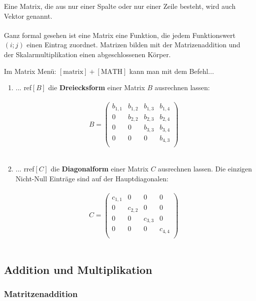 \documentclass[../MAIN/main.tex]{subfiles}
\begin{document}
\begin{Bemerkung}
Eine Matrix, die aus nur einer Spalte oder nur einer Zeile besteht, wird auch Vektor genannt.\\\\
Ganz formal gesehen ist eine Matrix eine Funktion, die jedem Funktionswert $(i;j)$ einen Eintrag zuordnet. Matrizen bilden mit der Matrizenaddition und der Skalarmultiplikation einen abgeschlossenen Körper.
\end{Bemerkung}


\begin{GTR-Tipp}
Im Matrix Menü: $[\text{matrix}] + [\text{MATH}]$ kann man mit dem Befehl...\\
\begin{enumerate}
\item ... ref$[B]$ die \textbf{Dreiecksform} einer Matrix $B$ ausrechnen lassen:\\\\
$$B= \begin{pmatrix}
b_{1,1}&b_{1,2}&b_{1,3}&b_{1,4}\\
0&b_{2,2}&b_{2,3}&b_{2,4}\\
0&0&b_{3,3}&b_{3,4}\\
0&0&0&b_{4,3}\\
\end{pmatrix}$$\\
\item ... rref$[C]$ die \textbf{Diagonalform} einer Matrix $C$ ausrechnen lassen. Die einzigen Nicht-Null Einträge sind auf der Hauptdiagonalen:\\\\
$$C= \begin{pmatrix}
c_{1,1}&0&0&0\\
0&c_{2,2}&0&0\\
0&0&c_{3,3}&0\\
0&0&0&c_{4,4}\\
\end{pmatrix}$$\\
\end{enumerate}
\end{GTR-Tipp}


\subsection{Addition und Multiplikation}

\subsubsection{Matritzenaddition}
\end{document}
